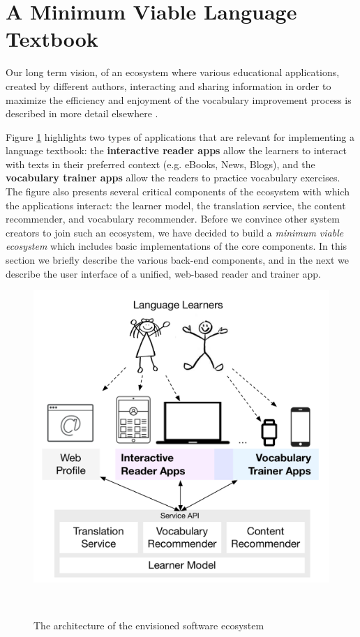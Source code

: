 
\section{A Minimum Viable Language Textbook}
\label{sec:system}

Our long term vision, of an ecosystem where various educational applications, created by different authors, interacting and sharing information in order to maximize the efficiency and enjoyment of the vocabulary improvement process is described in more detail elsewhere \cite{Lungu16}. 

Figure \ref{fig:architecture} highlights two types of applications that are relevant for implementing a language textbook: the {\bf interactive reader apps} allow the learners to interact with texts in their preferred context (e.g. eBooks, News, Blogs), and the {\bf vocabulary trainer apps} allow the readers to practice vocabulary exercises. 
% 
The figure also presents several critical components of the ecosystem with which the applications interact: the learner model, the translation service, the content recommender, and vocabulary recommender. Before we convince other system creators to join such an ecosystem, we have decided to build a {\em minimum viable ecosystem} which includes basic implementations of the core components. In this section we briefly describe the various back-end components, and in the next we describe the user interface of a unified, web-based reader and trainer app. 

\begin{figure}[h!]
\centering
  \includegraphics[width=0.7\columnwidth]{figures/zeeguu-architecture.pdf}
  \caption{The architecture of the envisioned software ecosystem}~\label{fig:architecture}
\end{figure}

